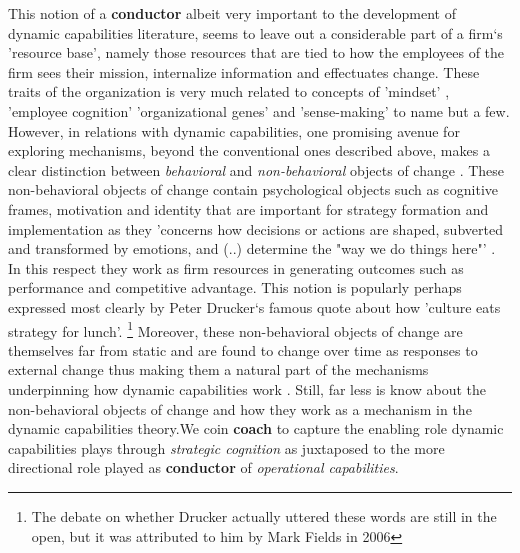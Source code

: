 This notion of a {\bf conductor} albeit very important to the development of dynamic
capabilities literature, seems to leave out a considerable part of a firm`s 'resource
base', namely those resources that are tied to how the employees of the firm sees their
mission, internalize information and effectuates change. These traits of the organization
is very much related to concepts of 'mindset' \citep{Dweck2016}, 'employee cognition'
\citep{Lakoff1987,Gavetti2012} 'organizational genes' \citep{Nelson1982} and
'sense-making' \citep{Weick1995} to name but a few. However, in relations with dynamic
capabilities, one promising avenue for exploring mechanisms, beyond the conventional ones
described above, makes a clear distinction between \emph{behavioral} and
\emph{non-behavioral} objects of change \citep{Verona2011}. These non-behavioral objects
of change contain psychological objects such as cognitive frames, motivation and identity
that are important for strategy formation and implementation \citep{Vince2011,Gavetti2012}
as they 'concerns how decisions or actions are shaped, subverted and transformed by
emotions, and (..) determine the "way we do things here"' \citep[p. 338]{Vince2011}. In
this respect they work as firm resources in generating outcomes such as performance and
competitive advantage. This notion is popularly perhaps expressed most clearly by Peter
Drucker`s famous quote about how 'culture eats strategy for lunch'. \footnote{The debate
  on whether Drucker actually uttered these words are still in the open, but it was
  attributed to him by Mark Fields in 2006} Moreover, these non-behavioral objects of
change are themselves far from static and are found to change over time as responses to
external change \citep{Zollo2016} thus making them a natural part of the mechanisms
underpinning how dynamic capabilities work \citep{Schilke2018,Verona2011}.  Still, far less
is know about the non-behavioral objects of change and how they work as a mechanism in the
dynamic capabilities theory.We coin {\bf coach} to capture the enabling role dynamic
capabilities plays through \emph{strategic cognition} as
juxtaposed to the more directional role played as {\bf conductor} of \emph{operational capabilities}.



